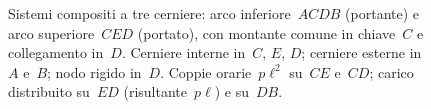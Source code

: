 \begin{figure}[htbp]
	\caption{Sistemi compositi a tre cerniere: arco inferiore~$ACDB$
		(portante) e arco superiore~$CED$ (portato), con montante
		comune in chiave~$C$ e collegamento in~$D$. Cerniere interne
		in~$C$, $E$, $D$; cerniere esterne in~$A$ e~$B$; nodo rigido
		in~$D$. Coppie orarie~$p\ell^2$ su~$CE$ e~$CD$; carico
		distribuito su~$ED$ (risultante~$p\ell$) e su~$DB$.}
	\label{fig:composito3c_schema}
\end{figure}
